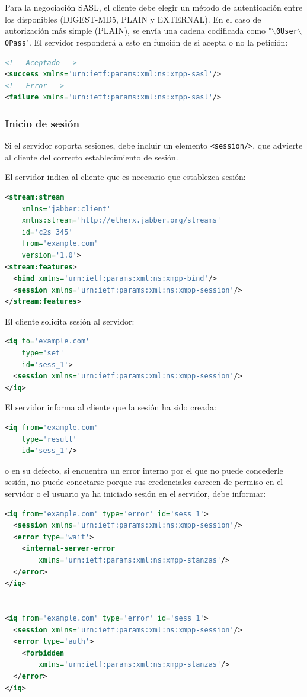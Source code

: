 \documentclass[a4paper, 11pt]{article} %
\begin{document}
    Para la negociación SASL, el cliente debe elegir un método de autenticación entre los disponibles
    (DIGEST-MD5, PLAIN y EXTERNAL). En el caso de autorización más simple (PLAIN), se envía una cadena
    codificada como "\texttt{$\backslash$0User$\backslash$0Pass}". El servidor responderá a esto en 
    función de si acepta o no la petición:
    \begin{lstlisting}[language=XML]
<!-- Aceptado -->
<success xmlns='urn:ietf:params:xml:ns:xmpp-sasl'/>
<!-- Error -->
<failure xmlns='urn:ietf:params:xml:ns:xmpp-sasl'/>
    \end{lstlisting}
    
  \subsubsection{Inicio de sesión}
    Si el servidor soporta sesiones, debe incluir un elemento \texttt{<session/>}, que advierte al cliente del 
    correcto establecimiento de sesión.
    
    El servidor indica al cliente que es necesario que establezca sesión:
\begin{lstlisting}[language=XML]
<stream:stream
    xmlns='jabber:client'
    xmlns:stream='http://etherx.jabber.org/streams'
    id='c2s_345'
    from='example.com'
    version='1.0'>
<stream:features>
  <bind xmlns='urn:ietf:params:xml:ns:xmpp-bind'/>
  <session xmlns='urn:ietf:params:xml:ns:xmpp-session'/>
</stream:features>
\end{lstlisting}

    El cliente solicita sesión al servidor:
\begin{lstlisting}[language=XML]
<iq to='example.com'
    type='set'
    id='sess_1'>
  <session xmlns='urn:ietf:params:xml:ns:xmpp-session'/>
</iq>
\end{lstlisting}

    El servidor informa al cliente que la sesión ha sido creada:
\begin{lstlisting}[language=XML]   
<iq from='example.com'
    type='result'
    id='sess_1'/>
\end{lstlisting}
    o en su defecto, si encuentra un error interno por el que no puede concederle sesión, no puede conectarse porque
    sus credenciales carecen de permiso en el servidor o el usuario ya ha iniciado sesión en el servidor, debe informar:
\begin{lstlisting}[language=XML]
<iq from='example.com' type='error' id='sess_1'>
  <session xmlns='urn:ietf:params:xml:ns:xmpp-session'/>
  <error type='wait'>
    <internal-server-error
        xmlns='urn:ietf:params:xml:ns:xmpp-stanzas'/>
  </error>
</iq>


<iq from='example.com' type='error' id='sess_1'>
  <session xmlns='urn:ietf:params:xml:ns:xmpp-session'/>
  <error type='auth'>
    <forbidden
        xmlns='urn:ietf:params:xml:ns:xmpp-stanzas'/>
  </error>
</iq>
\end{lstlisting}
\end{document}
